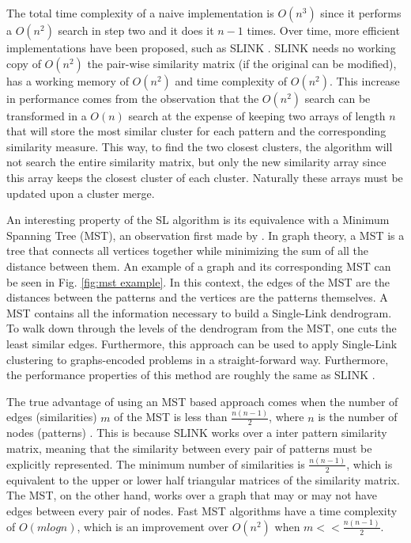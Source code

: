 The total time complexity of a naive implementation is $O(n^3)$ since it performs a $O(n^2)$ search in step two and it does it $n-1$ times.
Over time, more efficient implementations have been proposed, such as SLINK \cite{Sibson1973}.
SLINK needs no working copy of $O(n^2)$ the pair-wise similarity matrix (if the original can be modified), has a working memory of $O(n^2)$ and time complexity of $O(n^2)$.
This increase in performance comes from the observation that the $O(n^2)$ search can be transformed in a $O(n)$ search at the expense of keeping two arrays of length $n$ that will store the most similar cluster for each pattern and the corresponding similarity measure.
This way, to find the two closest clusters, the algorithm will not search the entire similarity matrix, but only the new similarity array since this array keeps the closest cluster of each cluster.
Naturally these arrays must be updated upon a cluster merge.

An interesting property of the SL algorithm is its equivalence with a Minimum Spanning Tree (MST), an observation first made by \cite{Gower1969}.
In graph theory, a MST is a tree that connects all vertices together while minimizing the sum of all the distance between them.
An example of a graph and its corresponding MST can be seen in Fig. \ref{fig:mst example}.
In this context, the edges of the MST are the distances between the patterns and the vertices are the patterns themselves.
A MST contains all the information necessary to build a Single-Link dendrogram.
To walk down through the levels of the dendrogram from the MST, one cuts the least similar edges.
Furthermore, this approach can be used to apply Single-Link clustering to graphs-encoded problems in a straight-forward way.
Furthermore, the performance properties of this method are roughly the same as SLINK  \cite{Mullner2011}.

The true advantage of using an MST based approach comes when the number of edges (similarities) $m$ of the MST is less than $\frac{n(n-1)}{2}$, where $n$ is the number of nodes (patterns) \cite{starck2007astronomical}.
This is because SLINK works over a inter pattern similarity matrix, meaning that the similarity between every pair of patterns must be explicitly represented.
The minimum number of similarities is $\frac{n(n-1)}{2}$, which is equivalent to the upper or lower half triangular matrices of the similarity matrix.
The MST, on the other hand, works over a graph that may or may not have edges between every pair of nodes.
Fast MST algorithms have a time complexity of $O(m log n)$, which is an improvement over $O(n^2)$ when $m << \frac{n(n-1)}{2}$.


